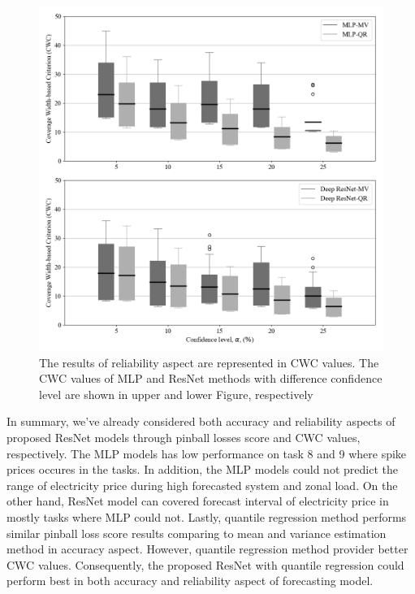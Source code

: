 \documentclass[review]{elsarticle}
\begin{document}
    \begin{figure}[H]
      \centering
      \includegraphics[width=12cm]{boxcompare_MV-QR}
      \caption{The results of reliability aspect are represented in CWC values.
      The CWC values of MLP and ResNet methods with difference confidence level are shown in upper and lower Figure, respectively}
      \label{Fig:CWC}
    \end{figure}

    In summary, we've already considered both accuracy and reliability aspects of proposed ResNet models through pinball losses score and CWC values, respectively.
    The MLP models has low performance on task 8 and 9 where spike prices occures in the tasks.
    In addition, the MLP models could not predict the range of electricity price during high forecasted system and zonal load.
    On the other hand, ResNet model can covered forecast interval of electricity price in mostly tasks where MLP could not.
    Lastly, quantile regression method performs similar pinball loss score results comparing to mean and variance estimation method in accuracy aspect.
    However, quantile regression method provider better CWC values.
    Consequently, the proposed ResNet with quantile regression could perform best in both accuracy and reliability aspect of forecasting model.
\end{document}
